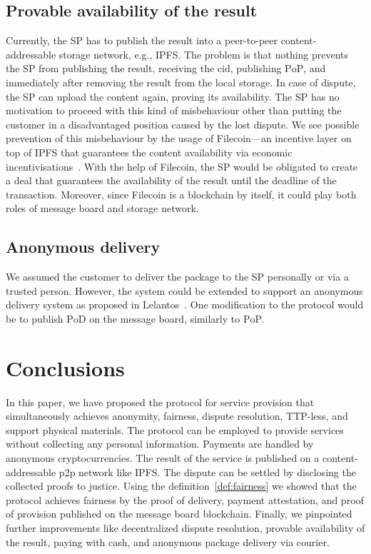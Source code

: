 \documentclass{ieeeaccess}
\begin{document}
\subsection{Provable availability of the
result}\label{cryptographically-provable-availability-of-results}

Currently, the SP has to publish the result into a peer-to-peer content-addressable storage network, e.g., IPFS. The problem is that nothing prevents the SP from publishing the result, receiving the $\mathrm{cid}$, publishing $\mathrm{PoP}$, and immediately after removing the result from the local storage. In case of dispute, the SP can upload the content again, proving its availability. The SP has no motivation to proceed with this kind of misbehaviour other than putting the customer in a disadvantaged position caused by the lost dispute. We see possible prevention of this misbehaviour by the usage of Filecoin—an incentive layer on top of IPFS that guarantees the content availability via economic incentivisations~\cite{protocollabsFilecoinDecentralizedStorage2017}. With the help of Filecoin, the SP would be obligated to create a deal that guarantees the availability of the result until the deadline of the transaction. Moreover, since Filecoin is a blockchain by itself, it could play both roles of message board and storage network.

\subsection{Anonymous delivery}\label{anonymous-delivery}

We assumed the customer to deliver the package to the SP personally or via a trusted person. However, the system could be extended to support an anonymous delivery system as proposed in Lelantos~\cite{altawyLelantosBlockchainBasedAnonymous2017}. One modification to the protocol would be to publish $\mathrm{PoD}$ on the message board, similarly to $\mathrm{PoP}$.

\section{Conclusions}\label{sec:conclusion}
In this paper, we have proposed the protocol for service provision that simultaneously achieves anonymity, fairness, dispute resolution, TTP-less, and support physical materials. The protocol can be employed to provide services without collecting any personal information. Payments are handled by anonymous cryptocurrencies. The result of the service is published on a content-addressable p2p network like IPFS. The dispute can be settled by disclosing the collected proofs to justice. 
Using the definition~\ref{def:fairness} we showed that the protocol achieves fairness by the proof of delivery, payment attestation, and proof of provision published on the message board blockchain. Finally, we pinpointed further improvements like decentralized dispute resolution, provable availability of the result, paying with cash, and anonymous package delivery via courier.
\end{document}
